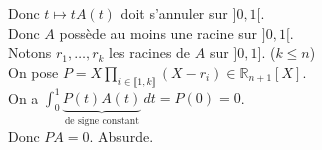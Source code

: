 \documentclass[../main.tex]{subfiles}
\begin{document}
\begin{enumerate}
\begin{enumerate}
        Donc $t\mapsto tA(t)$ doit s'annuler sur $]0, 1[$. \\
        Donc $A$ possède au moins une racine sur $]0, 1[$. \\
        Notons $r_1, \ldots, r_k$ les racines de $A$ sur $]0, 1]$. ($k\leq n$) \\
        On pose $P = X \prod_{i\in \llbracket 1, k \rrbracket}(X - r_i)\in \mathbb{R}_{n+1}[X]$. \\
        On a $\int_{0}^{1} \underbrace{P(t)A(t)}_{\text{de signe constant}} \,dt = P(0) = 0$. \\
        Donc $PA = 0$. Absurde. 
    \end{enumerate}
\end{enumerate}
\end{document}
